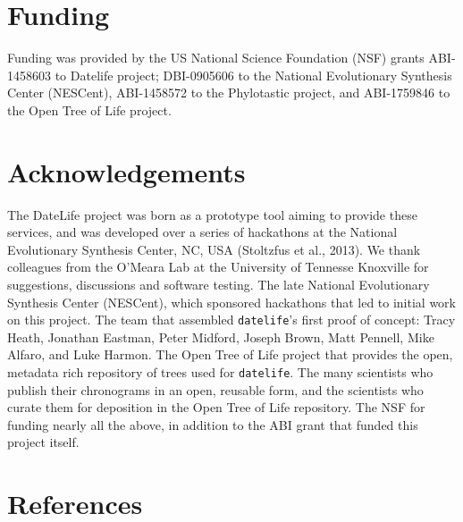 \documentclass[
  english,
  man]{apa6}
\begin{document}
\hypertarget{funding}{%
\section{Funding}\label{funding}}

Funding was provided by the US National Science Foundation (NSF) grants ABI-1458603 to Datelife project; DBI-0905606 to the National Evolutionary Synthesis Center (NESCent), ABI-1458572 to the Phylotastic project, and ABI-1759846 to the Open Tree of Life project.

\hypertarget{acknowledgements}{%
\section{Acknowledgements}\label{acknowledgements}}

The DateLife project was born as a prototype tool aiming to provide these services, and was developed over a series of hackathons at the National Evolutionary Synthesis Center, NC, USA (Stoltzfus et al., 2013).
We thank colleagues from the O'Meara Lab at the University
of Tennesse Knoxville for suggestions, discussions and software testing.
The late National Evolutionary Synthesis Center (NESCent), which sponsored hackathons
that led to initial work on this project. The team that assembled \texttt{datelife}'s first proof of concept: Tracy Heath, Jonathan Eastman, Peter Midford, Joseph Brown, Matt Pennell, Mike Alfaro, and Luke Harmon.
The Open Tree of Life project that provides the open, metadata rich repository of
trees used for \texttt{datelife}.
The many scientists who publish their chronograms in an open, reusable form, and
the scientists who curate them for deposition in the Open Tree of Life repository.
The NSF for funding nearly all the above, in addition to the ABI grant that funded this project itself.

\newpage

\hypertarget{references}{%
\section{References}\label{references}}

\begingroup
\setlength{\parindent}{-0.5in}
\setlength{\leftskip}{0.5in}
\end{document}
